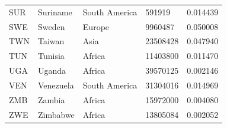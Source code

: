 \documentclass[11pt]{report}
\begin{document}
\begin{table}[h!]
\begin{tabular}{lllll}
            SUR                           & Suriname                  & South America                  & 591919                        & 0.014439                           \\
            SWE                           & Sweden                    & Europe                         & 9960487                       & 0.050008                           \\
            TWN                           & Taiwan                    & Asia                           & 23508428                      & 0.047940                           \\
            TUN                           & Tunisia                   & Africa                         & 11403800                      & 0.011470                           \\
            UGA                           & Uganda                    & Africa                         & 39570125                      & 0.002146                           \\
            VEN                           & Venezuela                 & South America                  & 31304016                      & 0.014969                           \\
            ZMB                           & Zambia                    & Africa                         & 15972000                      & 0.004080                           \\
            ZWE                           & Zimbabwe                  & Africa                         & 13805084                      & 0.002052
        \end{tabular}
    \end{table}
\end{document}
